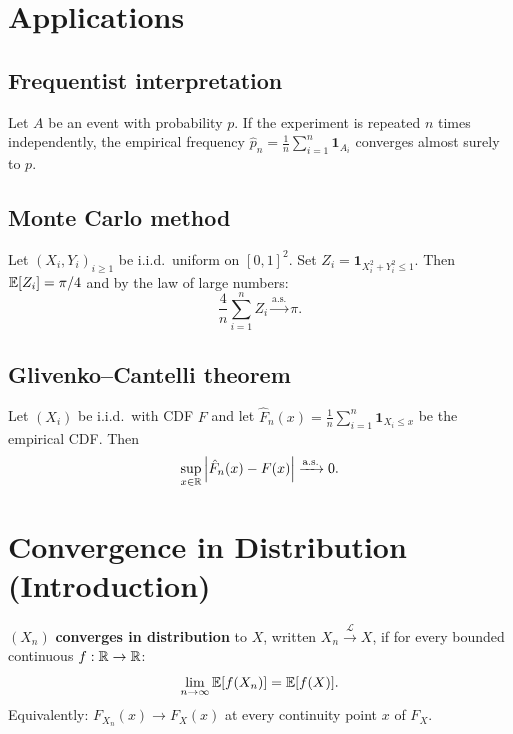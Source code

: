 \section{Applications}

\subsection{Frequentist interpretation}

\begin{corollary}
Let $A$ be an event with probability $p$. If the experiment is repeated $n$ times
independently, the empirical frequency
$\hat{p}_n = \frac{1}{n}\sum_{i=1}^n \mathbf{1}_{A_i}$ converges almost surely
to $p$.
\end{corollary}

\subsection{Monte Carlo method}

\begin{example}[Estimating $\pi$]
Let $(X_i, Y_i)_{i \geq 1}$ be i.i.d.\ uniform on $[0,1]^2$. Set
$Z_i = \mathbf{1}_{X_i^2+Y_i^2 \leq 1}$. Then $\mathbb{E}[Z_i] = \pi/4$ and by the
law of large numbers:
\[
    \frac{4}{n}\sum_{i=1}^n Z_i \xrightarrow{\text{a.s.}} \pi.
\]
\end{example}

\subsection{Glivenko--Cantelli theorem}

\begin{theorem}
Let $(X_i)$ be i.i.d.\ with CDF $F$ and let
$\hat{F}_n(x) = \frac{1}{n}\sum_{i=1}^n \mathbf{1}_{X_i \leq x}$ be the
empirical CDF. Then
\[
    \sup_{x \in \mathbb{R}}\left| \hat{F}_n(x) - F(x) \right| \xrightarrow{\text{a.s.}} 0.
\]
\end{theorem}

\section{Convergence in Distribution (Introduction)}

\begin{definition}
$(X_n)$ \textbf{converges in distribution} to $X$, written
$X_n \xrightarrow{\mathcal{L}} X$, if for every bounded continuous
$f : \mathbb{R} \to \mathbb{R}$:
\[
    \lim_{n \to \infty}\mathbb{E}[f(X_n)] = \mathbb{E}[f(X)].
\]
Equivalently: $F_{X_n}(x) \to F_X(x)$ at every continuity point $x$ of $F_X$.
\end{definition}

